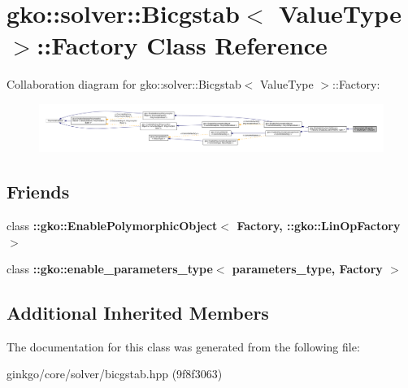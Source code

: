 \hypertarget{classgko_1_1solver_1_1Bicgstab_1_1Factory}{}\section{gko\+:\+:solver\+:\+:Bicgstab$<$ Value\+Type $>$\+:\+:Factory Class Reference}
\label{classgko_1_1solver_1_1Bicgstab_1_1Factory}


Collaboration diagram for gko\+:\+:solver\+:\+:Bicgstab$<$ Value\+Type $>$\+:\+:Factory\+:
\nopagebreak
\begin{figure}[H]
\begin{center}
\leavevmode
\includegraphics[width=350pt]{classgko_1_1solver_1_1Bicgstab_1_1Factory__coll__graph}
\end{center}
\end{figure}
\subsection*{Friends}
\begin{DoxyCompactItemize}
\item 
\mbox{\label{classgko_1_1solver_1_1Bicgstab_1_1Factory_a27e9bbc94a1c1c59f40833153eda8f78}} 
class {\bfseries \+::gko\+::\+Enable\+Polymorphic\+Object$<$ Factory, \+::gko\+::\+Lin\+Op\+Factory $>$}
\item 
\mbox{\label{classgko_1_1solver_1_1Bicgstab_1_1Factory_a0d176cbd42d6214e11aee8c30ca256fc}} 
class {\bfseries \+::gko\+::enable\+\_\+parameters\+\_\+type$<$ parameters\+\_\+type, Factory $>$}
\end{DoxyCompactItemize}
\subsection*{Additional Inherited Members}


The documentation for this class was generated from the following file\+:\begin{DoxyCompactItemize}
\item 
ginkgo/core/solver/bicgstab.\+hpp (9f8f3063)\end{DoxyCompactItemize}
